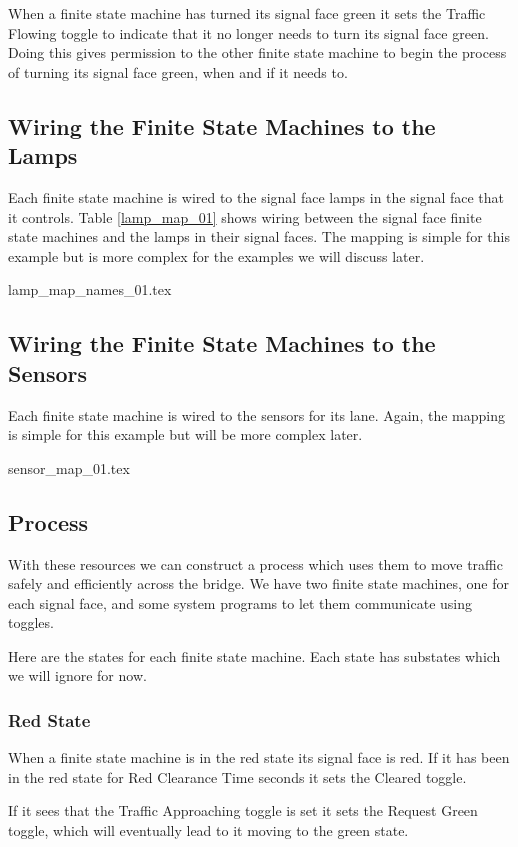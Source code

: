 \documentclass[letterpaper,twoside]{article}
\begin{document}
When a finite state machine has turned its signal face green it sets the
Traffic Flowing toggle to indicate that it no longer needs to turn
its signal face green.
Doing this gives permission to the other finite state machine to begin the
process of turning its signal face green, when and if it needs to.

\subsection{Wiring the Finite State Machines to the Lamps}

Each finite state machine is wired to the signal face lamps in the
signal face that it controls.
Table \ref{lamp_map_01} shows wiring between the signal
face finite state machines and the lamps in their signal faces.
The mapping is simple for this example but is more complex
for the examples we will discuss later.

 {lamp_map_names_01.tex}

\subsection{Wiring the Finite State Machines to the Sensors}

Each finite state machine is wired to the sensors
for its lane.  Again, the mapping is simple for this example
but will be more complex later.

 {sensor_map_01.tex}

\subsection{Process}

With these resources we can construct a process which uses them
to move traffic safely and efficiently across the bridge.
We have two finite state machines, one for each signal face,
and some system programs to let them communicate using toggles.

Here are the states for each finite state machine.  Each state
has substates which we will ignore for now.

\subsubsection{Red State}
When a finite state machine is in the red state its signal face is red.
If it has been in the red state for Red Clearance Time seconds
it sets the Cleared toggle.

If it sees that the Traffic Approaching toggle is set it sets
the Request Green toggle, which will eventually lead to it moving
to the green state.
\end{document}
